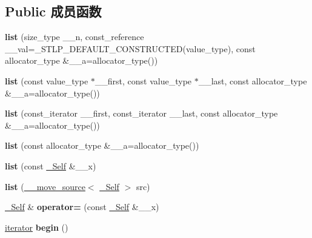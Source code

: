 \subsection*{Public 成员函数}
\begin{DoxyCompactItemize}
\item 
\mbox{\label{classlist_a26599e1e724cb6703488c10dcbcb5058}} 
{\bfseries list} (size\+\_\+type \+\_\+\+\_\+n, const\+\_\+reference \+\_\+\+\_\+val=\+\_\+\+S\+T\+L\+P\+\_\+\+D\+E\+F\+A\+U\+L\+T\+\_\+\+C\+O\+N\+S\+T\+R\+U\+C\+T\+ED(value\+\_\+type), const allocator\+\_\+type \&\+\_\+\+\_\+a=allocator\+\_\+type())
\item 
\mbox{\label{classlist_a6376b412c44ef40a1bb1c3e276f78526}} 
{\bfseries list} (const value\+\_\+type $\ast$\+\_\+\+\_\+first, const value\+\_\+type $\ast$\+\_\+\+\_\+last, const allocator\+\_\+type \&\+\_\+\+\_\+a=allocator\+\_\+type())
\item 
\mbox{\label{classlist_ad057f34d6514d6a725464d897a071625}} 
{\bfseries list} (const\+\_\+iterator \+\_\+\+\_\+first, const\+\_\+iterator \+\_\+\+\_\+last, const allocator\+\_\+type \&\+\_\+\+\_\+a=allocator\+\_\+type())
\item 
\mbox{\label{classlist_af0d639828145b9429995b52d2b647f79}} 
{\bfseries list} (const allocator\+\_\+type \&\+\_\+\+\_\+a=allocator\+\_\+type())
\item 
\mbox{\label{classlist_a576d9e448600fb329de231f79ee99b64}} 
{\bfseries list} (const \hyperlink{classlist}{\+\_\+\+Self} \&\+\_\+\+\_\+x)
\item 
\mbox{\label{classlist_aad77ca312f745fad13978f49b9b5d749}} 
{\bfseries list} (\hyperlink{class____move__source}{\+\_\+\+\_\+move\+\_\+source}$<$ \hyperlink{classlist}{\+\_\+\+Self} $>$ src)
\item 
\mbox{\label{classlist_ade698028fd6cb9a0ebd0fdbe650bb1b6}} 
\hyperlink{classlist}{\+\_\+\+Self} \& {\bfseries operator=} (const \hyperlink{classlist}{\+\_\+\+Self} \&\+\_\+\+\_\+x)
\item 
\mbox{\label{classlist_ab8ad2baf596ba643aea64318df063e65}} 
\hyperlink{structiterator}{iterator} {\bfseries begin} ()

\end{DoxyCompactItemize}
